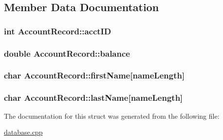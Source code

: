 \subsection{\-Member \-Data \-Documentation}
\hypertarget{struct_account_record_a587aa92adcd387d37427cd19c69e5932}{
\subsubsection[{acct\-I\-D}]{\setlength{\rightskip}{0pt plus 5cm}int {\bf \-Account\-Record\-::acct\-I\-D}}}\label{struct_account_record_a587aa92adcd387d37427cd19c69e5932}
\hypertarget{struct_account_record_a7de857c68a45702a0c1c4720b4570c2a}{
\subsubsection[{balance}]{\setlength{\rightskip}{0pt plus 5cm}double {\bf \-Account\-Record\-::balance}}}\label{struct_account_record_a7de857c68a45702a0c1c4720b4570c2a}
\hypertarget{struct_account_record_a89df48cc152b78efda9060a0cc461dd1}{
\subsubsection[{first\-Name}]{\setlength{\rightskip}{0pt plus 5cm}char {\bf \-Account\-Record\-::first\-Name}\mbox{[}{\bf name\-Length}\mbox{]}}}\label{struct_account_record_a89df48cc152b78efda9060a0cc461dd1}
\hypertarget{struct_account_record_ab9b4c37852573096dd9c81bec70f68b9}{
\subsubsection[{last\-Name}]{\setlength{\rightskip}{0pt plus 5cm}char {\bf \-Account\-Record\-::last\-Name}\mbox{[}{\bf name\-Length}\mbox{]}}}\label{struct_account_record_ab9b4c37852573096dd9c81bec70f68b9}


\-The documentation for this struct was generated from the following file\-:\begin{DoxyCompactItemize}
\item 
\hyperlink{database_8cpp}{database.\-cpp}\end{DoxyCompactItemize}
